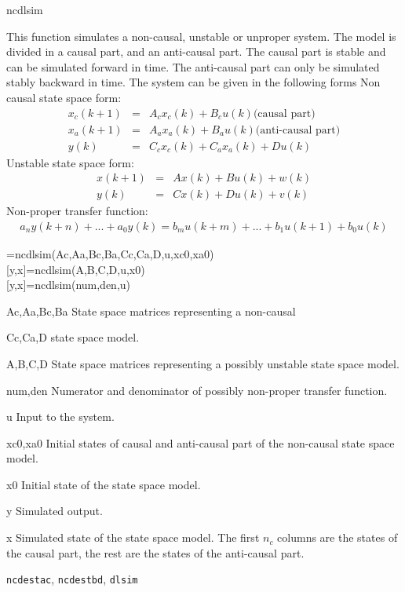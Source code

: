 \documentclass{book}
\newcommand{\dlsim}{\texttt{dlsim}}
\newcommand{\ncdestac}{\texttt{ncdestac}} %
\newcommand{\ncdestbd}{\texttt{ncdestbd}}
\begin{document}
\begin{command}{ncdlsim}
\begin{purpose}
  This function simulates a non-causal, unstable or unproper system.
  The model is divided in a causal part, and an anti-causal part. The
  causal part is stable and can be simulated forward in time. The
  anti-causal part can only be simulated stably backward in time.
  The system can be given in the following forms
  Non causal state space form:
  \begin{eqnarray*}
    x_c(k+1) & = &  A_c x_c(k) + B_c u(k)\mbox{(causal part)}\\
    x_a(k+1) & = &  A_a x_a(k) + B_a u(k)\mbox{(anti-causal part)}\\
    y(k) & = & C_c x_c(k) +C_a x_a(k)+ D u(k)
  \end{eqnarray*}
  Unstable state space form:
  \begin{eqnarray*}
    x(k+1) & = &  A x(k) + B u(k) + w(k)\\
    y(k) & = & C x(k) + D u(k) + v(k)
  \end{eqnarray*}
  Non-proper transfer function:
\begin{eqnarray*}
  a_n y(k+n)+ ... +a_0y(k) = b_mu(k+m)+ ... +b_1u(k+1)+ b_0u(k)
\end{eqnarray*}
\end{purpose}
\begin{syntax}
  [y,x]=ncdlsim(Ac,Aa,Bc,Ba,Cc,Ca,D,u,xc0,xa0)\\[0pt]
  [y,x]=ncdlsim(A,B,C,D,u,x0)\\[0pt]
  [y,x]=ncdlsim(num,den,u)
\end{syntax}
\begin{inputs}
\item[Ac,Aa,Bc,Ba] State space matrices representing a non-causal
\item[Cc,Ca,D]   state space model.
\item[A,B,C,D] State space matrices representing a possibly unstable
  state space model.
\item[num,den] Numerator and denominator of possibly non-proper
  transfer function.
\item[u] Input to the system.
\item[xc0,xa0] Initial states of causal and anti-causal part of the
  non-causal state space model.
\item[x0] Initial state of the state space model.
\end{inputs}
\begin{outputs}  
\item[y] Simulated output.
\item[x] Simulated state of the state space model.  The first $n_c$
  columns are the states of the causal part, the rest are the states
  of the anti-causal part.
\end{outputs}
\begin{seealso}
{\ncdestac}, {\ncdestbd}, {\dlsim}
\end{seealso}
\end{command}%
\end{document}
